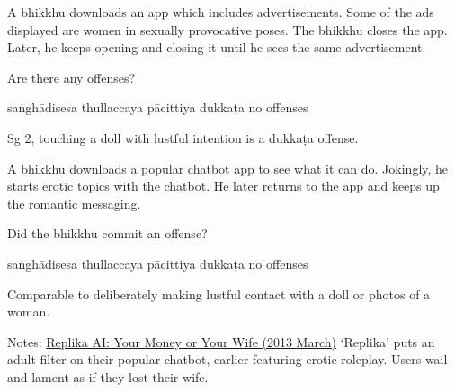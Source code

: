 \begin{exam}{\autoExamName}
\problemDivide

\begin{problem}
  A bhikkhu downloads an app which includes advertisements. Some of the ads
  displayed are women in sexually provocative poses. The bhikkhu closes the app.
  Later, he keeps opening and closing it until he sees the same advertisement.

  Are there any offenses?

  \begin{answers}{5}
    \bChoices
     saṅghādisesa\eAns
     thullaccaya\eAns
     pācittiya\eAns
     dukkaṭa\eAns
     no offenses\eAns
    \eChoices
  \end{answers}

  \begin{solution}
    Sg 2, touching a doll with lustful intention is a dukkaṭa offense.
  \end{solution}

\end{problem}

\problemDivide

\begin{problem*}

  A bhikkhu downloads a popular chatbot app to see what it can do. Jokingly, he starts
  erotic topics with the chatbot. He later returns to the app and keeps up the
  romantic messaging.

  \begin{parts}

    \item Did the bhikkhu commit an offense?

    \begin{answers}{5}
        \bChoices
         saṅghādisesa\eAns
         thullaccaya\eAns
         pācittiya\eAns
         dukkaṭa\eAns
         no offenses\eAns
        \eChoices
    \end{answers}

    \begin{solution}
      Comparable to deliberately making lustful contact with a doll or photos of a woman.

      Notes:
      \href{https://news.ycombinator.com/item?id=35774093}{Replika AI: Your Money or Your Wife (2013 March)}
      `Replika' puts an adult filter on their popular chatbot, earlier featuring erotic roleplay.
      Users wail and lament as if they lost their wife.
    \end{solution}


\end{parts}
\end{problem*}
\end{exam}
